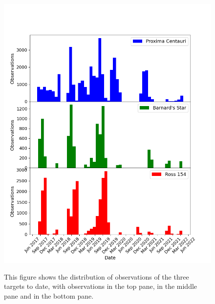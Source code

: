 \begin{figure}[!htbp]
\begin{center}
\includegraphics[scale=0.60]{images/rdwarfhist.png} \\
\end{center}   
\caption{This figure shows the distribution of observations of the three
{\rdwarf} targets to date, with {\prox} observations in the top pane, {\bstar}
in the middle pane and {\ross} in the bottom pane.}
\protect\label{fig:rdwarfhist}
\end{figure}

\monthonly
{} 

